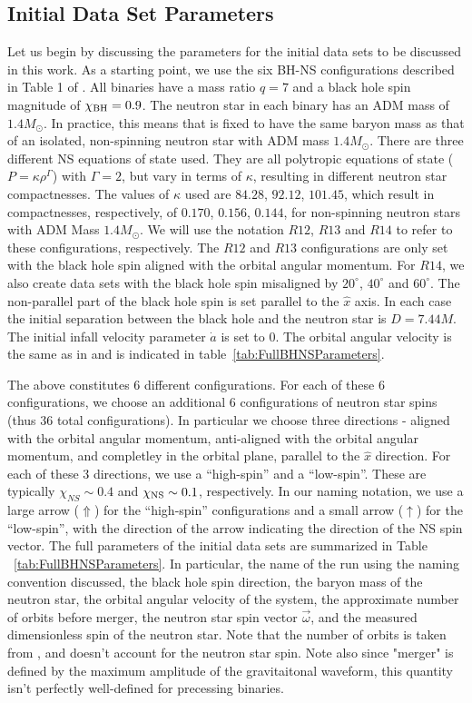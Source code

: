 \subsection{Initial Data Set Parameters}
Let us begin by discussing the parameters for the initial data sets to be discussed in this work. As a starting point, we use the six BH-NS configurations described in Table 1 of \cite{Foucart:2013a}. All binaries have a mass ratio $q=7$ and a black hole spin magnitude of $\chi_{\rm BH}=0.9$. The neutron star in each binary has an ADM mass of $1.4M_{\odot}$. In practice, this means that is fixed to have the same baryon mass as that of an isolated, non-spinning neutron star with ADM mass $1.4M_{\odot}$. There are three different NS equations of state used. They are all polytropic equations of state ($P=\kappa\rho^\Gamma$) with $\Gamma=2$, but vary in terms of $\kappa$, resulting in different neutron star compactnesses. The values of $\kappa$ used are $84.28$, $92.12$, $101.45$, which result in compactnesses, respectively, of $0.170$, $0.156$, $0.144$, for non-spinning neutron stars with ADM Mass $1.4M_{\odot}$. We will use the notation $R12$, $R13$ and $R14$ to refer to these configurations, respectively. The $R12$ and $R13$ configurations are only set with the black hole spin aligned with the orbital angular momentum. For $R14$, we also create data sets with the black hole spin misaligned by $20^{\circ}$, $40^{\circ}$ and $60^{\circ}$. The non-parallel part of the black hole spin is set parallel to the $\hat{x}$ axis. In each case the initial separation between the black hole and the neutron star is $D=7.44M$. The initial infall velocity parameter $\dot{a}$ is set to $0$. The orbital angular velocity is the same as in \cite{Foucart:2013a} and is indicated in table~\ref{tab:FullBHNSParameters}.

The above constitutes 6 different configurations. For each of these 6
configurations, we choose an additional 6 configurations of neutron
star spins (thus 36 total configurations). In particular we choose
three directions - aligned with the orbital angular momentum,
anti-aligned with the orbital angular momentum, and completley in the
orbital plane, parallel to the $\hat{x}$ direction. For each of these
3 directions, we use a ``high-spin'' and a ``low-spin''. These are
typically $\chi_{NS}\sim 0.4$ and $\chi_{\rm NS}\sim 0.1$,
respectively. In our naming notation, we use a large arrow
($\Uparrow$)  for the ``high-spin'' configurations and a small arrow
($\uparrow$) for the ``low-spin'', with the direction of the arrow
indicating the direction of the NS spin vector. The full parameters of
the initial data sets are summarized in Table
~\ref{tab:FullBHNSParameters}. In particular, the name of the run using the naming convention discussed,
the black hole spin direction, the baryon mass of the neutron star, the orbital angular velocity of the system,
the approximate number of orbits before merger, the neutron star spin vector $\vec{\omega}$, and the measured dimensionless
spin of the neutron star. Note that the number of orbits is taken from \cite{Foucart:2013a}, and doesn't account for the neutron star
spin. Note also since "merger" is defined by the maximum amplitude of the gravitaitonal waveform, this quantity isn't perfectly well-defined
for precessing binaries.

